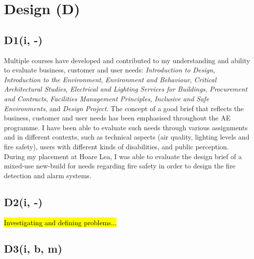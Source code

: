 
\section{Design (D)}

\subsection*{D1(i, -)}

Multiple courses have developed and contributed to my understanding and ability to evaluate business, customer and user needs:
\textit{Introduction to Design},
\textit{Introduction to the Environment},
\textit{Environment and Behaviour},
\textit{Critical Architectural Studies},
\textit{Electrical and Lighting Services for Buildings},
\textit{Procurement and Contracts},
\textit{Facilities Management Principles},
\textit{Inclusive and Safe Environments},
and \textit{Design Project}.
The concept of a good brief that reflects the business, customer and user needs has been emphasised throughout the AE programme.
I have been able to evaluate such needs through various assignments and in different contexts, such as technical aspects (air quality, lighting levels and fire safety), users with different kinds of disabilities, and public perception.
During my placement at Hoare Lea, I was able to evaluate the design brief of a mixed-use new-build for needs regarding fire safety in order to design the fire detection and alarm systems.



\subsection*{D2(i, -)}

\hl{Investigating and defining problems...}


\subsection*{D3(i, b, m)}

